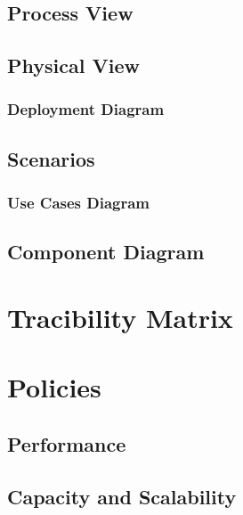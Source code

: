 \documentclass[12pt]{article}
\begin{document}
	\subsection{Process View}



	\subsection {Physical View}


	
	\subsubsection{Deployment Diagram}



	\subsection{Scenarios}

	\subsubsection{Use Cases Diagram}


	\subsection {Component Diagram}


	\section{Tracibility Matrix}



\lstset{language=Java}

\section{Policies}


	\subsection{Performance}


	
	\subsection{Capacity and Scalability}
\end{document}
